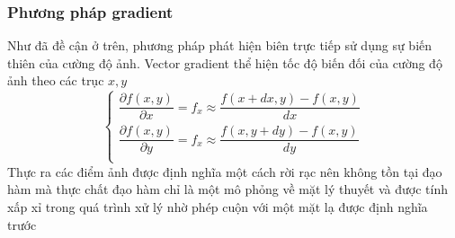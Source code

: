 \documentclass[12pt,oneside,a4]{report}
\begin{document}
\subsubsection{Phương pháp gradient}
Như đã đề cận ở trên, phương pháp phát hiện biên trực tiếp sử dụng sự biến thiên của cường độ ảnh. Vector gradient thể hiện tốc độ biến đối của cường độ ảnh theo các trục $x,y$ 
\begin{equation}
\begin{cases}
 \dfrac{\partial f(x,y)}{\partial x}=f_x\approx\dfrac{f(x+dx,y)-f(x,y)}{dx}\\
 \dfrac{\partial f(x,y)}{\partial y}=f_x\approx\dfrac{f(x,y+dy)-f(x,y)}{dy}\\
   \end{cases}
\end{equation}
Thực ra các điểm ảnh được định nghĩa một cách rời rạc nên không tồn tại đạo hàm mà thực chất đạo hàm chỉ là một mô phỏng về mặt lý thuyết và được tính xấp xỉ trong quá trình xử lý nhờ phép cuộn với một mặt lạ được định nghĩa trước
\end{document}
